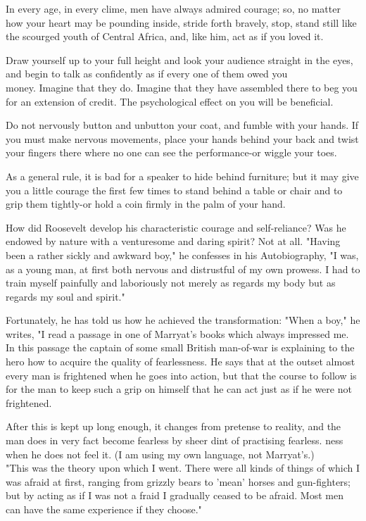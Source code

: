 \documentclass[10pt]{article}
\begin{document}
In every age, in every clime, men have always admired courage; so, no matter how your heart may be pounding inside, stride forth bravely, stop, stand still like the scourged youth of Central Africa, and, like him, act as if you loved it.

Draw yourself up to your full height and look your audience straight in the eyes, and begin to talk as confidently as if every one of them owed you\\
money. Imagine that they do. Imagine that they have assembled there to beg you for an extension of credit. The psychological effect on you will be beneficial.

Do not nervously button and unbutton your coat, and fumble with your hands. If you must make nervous movements, place your hands behind your back and twist your fingers there where no one can see the performance-or wiggle your toes.

As a general rule, it is bad for a speaker to hide behind furniture; but it may give you a little courage the first few times to stand behind a table or chair and to grip them tightly-or hold a coin firmly in the palm of your hand.

How did Roosevelt develop his characteristic courage and self-reliance? Was he endowed by nature with a venturesome and daring spirit? Not at all. "Having been a rather sickly and awkward boy," he confesses in his Autobiography, "I was, as a young man, at first both nervous and distrustful of my own prowess. I had to train myself painfully and laboriously not merely as regards my body but as regards my soul and spirit."

Fortunately, he has told us how he achieved the transformation: "When a boy," he writes, "I read a passage in one of Marryat's books which always impressed me. In this passage the captain of some small British man-of-war is explaining to the hero how to acquire the quality of fearlessness. He says that at the outset almost every man is frightened when he goes into action, but that the course to follow is for the man to keep such a grip on himself that he can act just as if he were not frightened.

After this is kept up long enough, it changes from pretense to reality, and the man does in very fact become fearless by sheer dint of practising fearless. ness when he does not feel it. (I am using my own language, not Marryat's.)\\
"This was the theory upon which I went. There were all kinds of things of which I was afraid at first, ranging from grizzly bears to 'mean' horses and gun-fighters; but by acting as if I was not a fraid I gradually ceased to be afraid. Most men can have the same experience if they choose."
\end{document}
